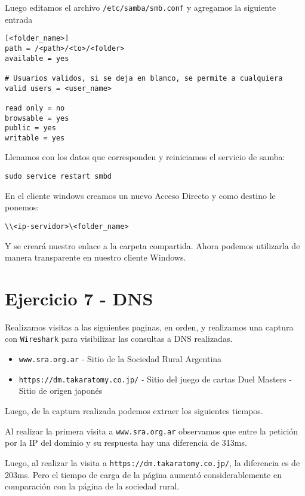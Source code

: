 Luego editamos el archivo \texttt{/etc/samba/smb.conf} y agregamos la siguiente entrada

\begin{lstlisting}
[<folder_name>]
path = /<path>/<to>/<folder>
available = yes

# Usuarios validos, si se deja en blanco, se permite a cualquiera
valid users = <user_name>

read only = no 
browsable = yes 
public = yes 
writable = yes
\end{lstlisting}

Llenamos con los datos que corresponden y reiniciamos el servicio de samba:

\begin{lstlisting}
sudo service restart smbd
\end{lstlisting}

En el cliente windows creamos un nuevo Acceso Directo y como destino le ponemos:

\begin{lstlisting}
\\<ip-servidor>\<folder_name>
\end{lstlisting}

Y se creará nuestro enlace a la carpeta compartida. Ahora podemos utilizarla de manera transparente en nuestro cliente Windows.

\section{Ejercicio 7 - DNS}

Realizamos visitas a las siguientes paginas, en orden, y realizamos una captura con \texttt{Wireshark} para visibilizar las consultas a DNS realizadas.

\begin{itemize}
    \item \texttt{www.sra.org.ar} - Sitio de la Sociedad Rural Argentina
    \item \texttt{https://dm.takaratomy.co.jp/} - Sitio del juego de cartas Duel Masters - Sitio de origen japonés
\end{itemize}

Luego, de la captura realizada podemos extraer los siguientes tiempos.

Al realizar la primera visita a \texttt{www.sra.org.ar} observamos que entre la petición por la IP del dominio y su respuesta hay una diferencia de 313ms.

Luego, al realizar la visita a \texttt{https://dm.takaratomy.co.jp/}, la diferencia es de 203ms. Pero el tiempo de carga de la página aumentó considerablemente en comparación con la página de la sociedad rural.

